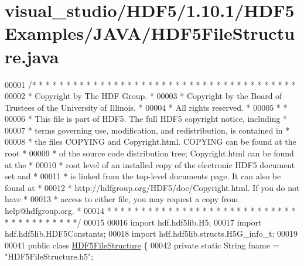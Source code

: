 \hypertarget{visual__studio_2_h_d_f5_21_810_81_2_h_d_f5_examples_2_j_a_v_a_2_h_d_f5_file_structure_8java_source}{}\section{visual\+\_\+studio/\+H\+D\+F5/1.10.1/\+H\+D\+F5\+Examples/\+J\+A\+V\+A/\+H\+D\+F5\+File\+Structure.java}
\label{visual__studio_2_h_d_f5_21_810_81_2_h_d_f5_examples_2_j_a_v_a_2_h_d_f5_file_structure_8java_source}

\begin{DoxyCode}
00001 \textcolor{comment}{/* * * * * * * * * * * * * * * * * * * * * * * * * * * * * * * * * * * * * * *}
00002 \textcolor{comment}{ * Copyright by The HDF Group.                                               *}
00003 \textcolor{comment}{ * Copyright by the Board of Trustees of the University of Illinois.         *}
00004 \textcolor{comment}{ * All rights reserved.                                                      *}
00005 \textcolor{comment}{ *                                                                           *}
00006 \textcolor{comment}{ * This file is part of HDF5.  The full HDF5 copyright notice, including     *}
00007 \textcolor{comment}{ * terms governing use, modification, and redistribution, is contained in    *}
00008 \textcolor{comment}{ * the files COPYING and Copyright.html.  COPYING can be found at the root   *}
00009 \textcolor{comment}{ * of the source code distribution tree; Copyright.html can be found at the  *}
00010 \textcolor{comment}{ * root level of an installed copy of the electronic HDF5 document set and   *}
00011 \textcolor{comment}{ * is linked from the top-level documents page.  It can also be found at     *}
00012 \textcolor{comment}{ * http://hdfgroup.org/HDF5/doc/Copyright.html.  If you do not have          *}
00013 \textcolor{comment}{ * access to either file, you may request a copy from help@hdfgroup.org.     *}
00014 \textcolor{comment}{ * * * * * * * * * * * * * * * * * * * * * * * * * * * * * * * * * * * * * * */}
00015 
00016 \textcolor{keyword}{import} hdf.hdf5lib.H5;
00017 \textcolor{keyword}{import} hdf.hdf5lib.HDF5Constants;
00018 \textcolor{keyword}{import} hdf.hdf5lib.structs.H5G\_info\_t;
00019 
00041 \textcolor{keyword}{public} \textcolor{keyword}{class }\hyperlink{class_h_d_f5_file_structure}{HDF5FileStructure} \{
00042     \textcolor{keyword}{private} \textcolor{keyword}{static} String fname  = \textcolor{stringliteral}{"HDF5FileStructure.h5"};

\end{DoxyCode}
